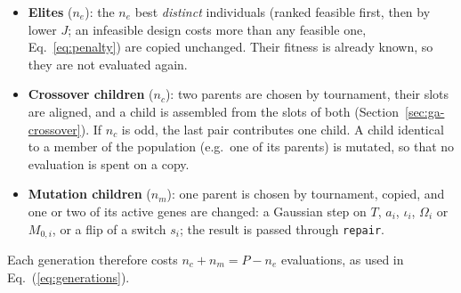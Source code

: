 \begin{itemize}
  \item \textbf{Elites} ($n_e$): the $n_e$ best \emph{distinct} individuals (ranked feasible first, then by
        lower $J$; an infeasible design costs more than any feasible one, Eq.~\ref{eq:penalty}) are copied unchanged. Their fitness is
        already known, so they are not evaluated again.
  \item \textbf{Crossover children} ($n_c$): two parents are chosen by tournament, their slots are
        aligned, and a child is assembled from the slots of both
        (Section~\ref{sec:ga-crossover}). If $n_c$ is odd, the last pair contributes one child.
        A child identical to a member of the population (e.g.\ one of its parents) is mutated, so
        that no evaluation is spent on a copy.
  \item \textbf{Mutation children} ($n_m$): one parent is chosen by tournament, copied, and one or
        two of its active genes are changed: a Gaussian step on $T$, $a_i$, $\iota_i$, $\Omega_i$
        or $M_{0,i}$, or a flip of a switch $s_i$; the result is passed through \texttt{repair}.
\end{itemize}
Each generation therefore costs $n_c+n_m=P-n_e$ evaluations, as used in Eq.~(\ref{eq:generations}).

